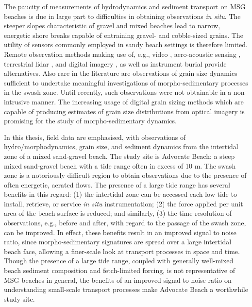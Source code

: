 The paucity of measurements of hydrodynamics and sediment transport on MSG beaches is due in large part to difficulties in obtaining observations \textit{in situ}. The steeper slopes characteristic of gravel and mixed beaches lead to narrow, energetic shore breaks capable of entraining gravel- and cobble-sized grains. The utility of sensors commonly employed in sandy beach settings is therefore limited. Remote observation methods making use of, e.g., video \citep{Holman_Stanley2007}, aero-acoustic sensing \citep{Turner_etal2008}, terrestrial lidar \citep{VanGaalen_etal2011}, and digital imagery \citep{Buscombe2013}, as well as instrument burial \citep[e.g.,][]{Raubenheimer_etal1998, Michallet_etal2009} provide alternatives. Also rare in the literature are observations of grain size dynamics sufficient to undertake meaningful investigations of morpho-sedimentary processes in the swash zone. Until recently, such observations were not obtainable in a non-intrusive manner. The increasing usage of digital grain sizing methods which are capable of producing estimates of grain size distributions from optical imagery is promising for the study of morpho-sedimentary dynamics.


In this thesis, field data are emphasised, with observations of hydro/morphodynamics, grain size, and sediment dynamics from the intertidal zone of a mixed sand-gravel beach. The study site is Advocate Beach: a steep mixed sand-gravel beach with a tide range often in excess of 10 m. The swash zone is a notoriously difficult region to obtain observations due to the presence of often energetic, aerated flows. The presence of a large tide range has several benefits in this regard: (1) the intertidal zone can be accessed each low tide to install, retrieve, or service \textit{in situ} instrumentation; (2) the force applied per unit area of the beach surface is reduced; and similarly, (3) the time resolution of observations, e.g., before and after, with regard to the passage of the swash zone, can be improved. In effect, these benefits result in an improved signal to noise ratio, since morpho-sedimentary signatures are spread over a large intertidal beach face, allowing a finer-scale look at transport processes in space and time. Though the presence of a large tide range, coupled with generally well-mixed beach sediment composition and fetch-limited forcing, is not representative of MSG beaches in general, the benefits of an improved signal to noise ratio on understanding small-scale transport processes make Advocate Beach a worthwhile study site.



